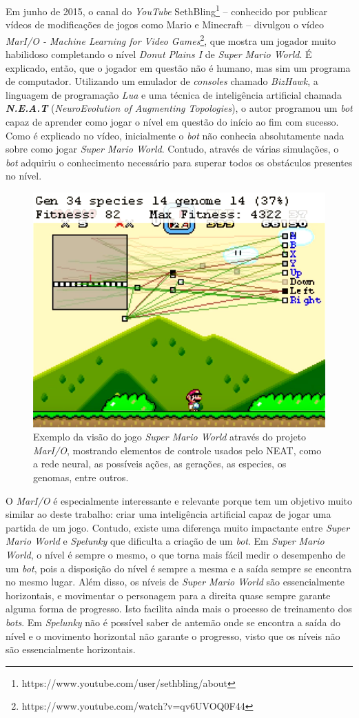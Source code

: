 Em junho de 2015, o canal do \textit{YouTube}
SethBling\footnote{https://www.youtube.com/user/sethbling/about} -- conhecido
por publicar vídeos de modificações de jogos como Mario e Minecraft -- divulgou
o vídeo \textit{MarI/O - Machine Learning for Video
Games}\footnote{https://www.youtube.com/watch?v=qv6UVOQ0F44}, que mostra um
jogador muito habilidoso completando o nível \textit{Donut Plains I} de
\textit{Super Mario World}. É explicado, então, que o jogador em questão não é
humano, mas sim um programa de computador. Utilizando um emulador de
\textit{consoles} chamado \textit{BizHawk}, a linguagem de programação
\textit{Lua} e uma técnica de inteligência artificial chamada
\textit{\textbf{N.E.A.T}} (\textit{NeuroEvolution of Augmenting Topologies}), o
autor programou um \textit{bot} capaz de aprender como jogar o nível em questão
do início ao fim com sucesso. Como é explicado no vídeo, inicialmente o
\textit{bot} não conhecia absolutamente nada sobre como jogar \textit{Super
Mario World}. Contudo, através de várias simulações, o \textit{bot} adquiriu
o conhecimento necessário para superar todos os obstáculos presentes no
nível.

\begin{figure}[htb!]
\centering
\includegraphics[width=.65\textwidth]{fig/mar-io-example.png}
\caption{\label{fig:mar-io-example}Exemplo da visão do jogo \textit{Super
Mario World} através do projeto \textit{MarI/O}, mostrando elementos de
controle usados pelo NEAT, como a rede neural, as possíveis ações, as
gerações, as especies, os genomas, entre outros.}
\end{figure}

O \textit{MarI/O} é especialmente interessante e relevante porque tem um
objetivo muito similar ao deste trabalho: criar uma inteligência artificial
capaz de jogar uma partida de um jogo. Contudo, existe uma diferença muito
impactante entre \textit{Super Mario World} e \textit{Spelunky} que dificulta a
criação de um \textit{bot}. Em \textit{Super Mario World}, o nível é sempre o
mesmo, o que torna mais fácil medir o desempenho de um \textit{bot}, pois a
disposição do nível é sempre a mesma e a saída sempre se encontra no mesmo
lugar. Além disso, os níveis de \textit{Super Mario World} são essencialmente
horizontais, e movimentar o personagem para a direita quase sempre garante
alguma forma de progresso. Isto facilita ainda mais o processo de treinamento
dos \textit{bots}. Em \textit{Spelunky} não é possível saber de antemão onde se
encontra a saída do nível e o movimento horizontal não garante o progresso,
visto que os níveis não são essencialmente horizontais.
